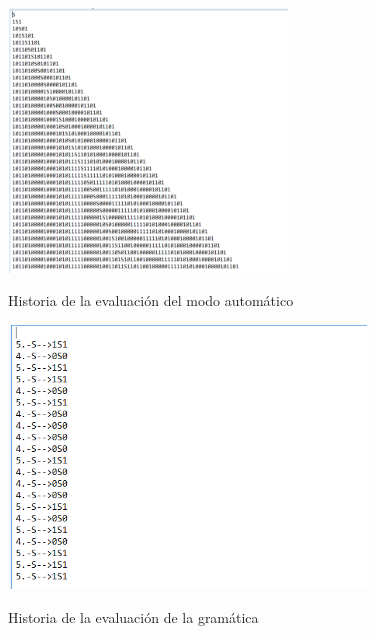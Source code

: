 \begin{figure}[H]
\includegraphics[width=\textwidth, height=7cm]{ArchivoHistoriaPal.png}
\label{fig:autotexto_alfabeto}
\caption{Historia de la evaluaci\'on del modo autom\'atico}
\end{figure}

\begin{figure}[H]
\includegraphics[width=\textwidth, height=7cm]{HistoriaPalA.png}
\label{fig:manualtexto_alfabeto}
\caption{Historia de la evaluaci\'on de la gram\'atica}
\end{figure}

\newpage